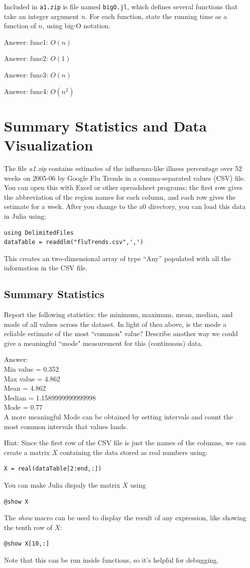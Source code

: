 \documentclass{article}
\def\ans#1{\par\gre{Answer: #1}}
\def\blu#1{{\color{blu}#1}}
\def\gre#1{{\color{gre}#1}}
\begin{document}
Included in \texttt{a1.zip} is file named \texttt{bigO.jl}, which defines several functions
that take an integer argument $n$. For each function, \blu{state the running time as a function of $n$, using big-O notation}.
\ans{func1: $O(n)$}
\ans{func2: $O(1)$}
\ans{func3: $O(n)$}
\ans{func4: $O(n^2)$}


\section{Summary Statistics and Data Visualization}

The file \emph{a1.zip} contains estimates of the influenza-like illness percentage over 52 weeks on 2005-06 by Google Flu Trends in a comma-separated values (CSV) file. You can open this with Excel or other spreadsheet programs; the first row gives the abbreviation of the region names for each column, and each row gives the estimate for a week.
After you change to the a0 directory, you can load this data in Julia using:
\begin{verbatim}
using DelimitedFiles
dataTable = readdlm("fluTrends.csv",',')
\end{verbatim}
This creates an two-dimensional array of type ``Any''  populated with all the information in the CSV file.

\subsection{Summary Statistics}

\blu{Report the following statistics}: the minimum, maximum, mean, median, and mode of all values across the dataset. In light of thea above, \blu{is the mode a reliable estimate of the most ``common" value? Describe another way we could give a meaningful ``mode" measurement for this (continuous) data.}
\ans{ \\ Min value = 0.352\\Max value = 4.862\\ Mean = 4.862\\
Median = 1.1589999999999998 \\ Mode = 0.77\\
A more meaningful Mode can be obtained by setting intervals and count the most common intervals that values lands.
}

Hint: Since the first row of the CSV file is just the names of the columns, we can create a matrix $X$ containing the data stored as real numbers using:
\begin{verbatim}
X = real(dataTable[2:end,:])
\end{verbatim}
You can make Julia dispaly the matrix $X$ using
\begin{verbatim}
@show X
\end{verbatim}
The \emph{show} macro can be used to display the result of any expression, like showing the tenth row of $X$:
\begin{verbatim}
@show X[10,:]
\end{verbatim}
Note that this can be run inside functions, so it's helpful for debugging.
\end{document}

